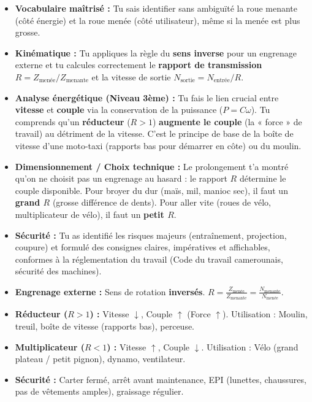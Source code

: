 \documentclass[11pt]{article}
\begin{document}
\begin{itemize}
    \item \textbf{Vocabulaire maîtrisé :} Tu sais identifier sans ambiguïté la roue menante (côté énergie) et la roue menée (côté utilisateur), même si la menée est plus grosse.
    \item \textbf{Kinématique :} Tu appliques la règle du \textbf{sens inverse} pour un engrenage externe et tu calcules correctement le \textbf{rapport de transmission} $R = Z_{\text{menée}}/Z_{\text{menante}}$ et la vitesse de sortie $N_{\text{sortie}} = N_{\text{entrée}}/R$.
    \item \textbf{Analyse énergétique (Niveau 3ème) :} Tu fais le lien crucial entre \textbf{vitesse} et \textbf{couple} via la conservation de la puissance ($P = C \omega$). Tu comprends qu'un \textbf{réducteur} ($R>1$) \textbf{augmente le couple} (la « force » de travail) au détriment de la vitesse. C'est le principe de base de la boîte de vitesse d'une moto-taxi (rapports bas pour démarrer en côte) ou du moulin.
    \item \textbf{Dimensionnement / Choix technique :} Le prolongement t'a montré qu'on ne choisit pas un engrenage au hasard : le rapport $R$ détermine le couple disponible. Pour broyer du dur (maïs, mil, manioc sec), il faut un \textbf{grand $R$} (grosse différence de dents). Pour aller vite (roues de vélo, multiplicateur de vélo), il faut un \textbf{petit $R$}.
    \item \textbf{Sécurité :} Tu as identifié les risques majeurs (entraînement, projection, coupure) et formulé des consignes claires, impératives et affichables, conformes à la réglementation du travail (Code du travail camerounais, sécurité des machines).
\end{itemize}

\begin{aretenir}
\begin{itemize}
    \item \textbf{Engrenage externe :} Sens de rotation \textbf{inversés}. $R = \frac{Z_{\text{menée}}}{Z_{\text{menante}}} = \frac{N_{\text{menante}}}{N_{\text{menée}}}$.
    \item \textbf{Réducteur ($R>1$) :} Vitesse $\downarrow$, Couple $\uparrow$ (Force $\uparrow$). Utilisation : Moulin, treuil, boîte de vitesse (rapports bas), perceuse.
    \item \textbf{Multiplicateur ($R<1$) :} Vitesse $\uparrow$, Couple $\downarrow$. Utilisation : Vélo (grand plateau / petit pignon), dynamo, ventilateur.
    \item \textbf{Sécurité :} Carter fermé, arrêt avant maintenance, EPI (lunettes, chaussures, pas de vêtements amples), graissage régulier.
\end{itemize}
\end{aretenir}
\end{document}
